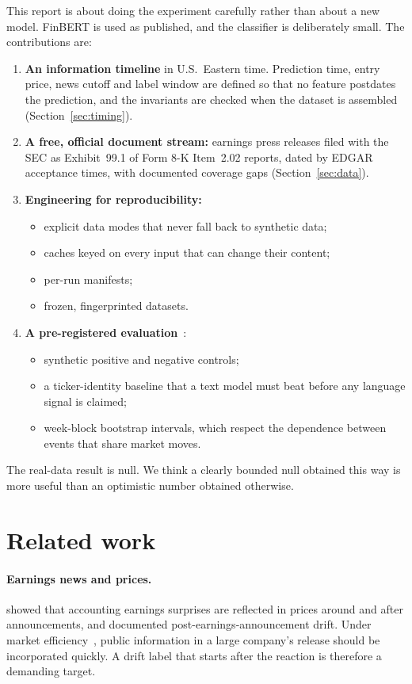 \documentclass[11pt]{article}
\begin{document}
This report is about doing the experiment carefully rather than about a new model. FinBERT is
used as published, and the classifier is deliberately small. The contributions are:
\begin{enumerate}
  \item \textbf{An information timeline} in U.S.\ Eastern time. Prediction time, entry price,
  news cutoff and label window are defined so that no feature postdates the prediction, and
  the invariants are checked when the dataset is assembled (Section~\ref{sec:timing}).
  \item \textbf{A free, official document stream:} earnings press releases filed with the SEC
  as Exhibit~99.1 of Form 8-K Item~2.02 reports, dated by EDGAR acceptance times, with
  documented coverage gaps (Section~\ref{sec:data}).
  \item \textbf{Engineering for reproducibility:}
  \begin{itemize}
    \item explicit data modes that never fall back to synthetic data;
    \item caches keyed on every input that can change their content;
    \item per-run manifests;
    \item frozen, fingerprinted datasets.
  \end{itemize}
  \item \textbf{A pre-registered evaluation}~\citep{nosek2018}:
  \begin{itemize}
    \item synthetic positive and negative controls;
    \item a ticker-identity baseline that a text model must beat before any language signal is
    claimed;
    \item week-block bootstrap intervals, which respect the dependence between events that
    share market moves.
  \end{itemize}
\end{enumerate}
The real-data result is null. We think a clearly bounded null obtained this way is more useful
than an optimistic number obtained otherwise.

\section{Related work}
\paragraph{Earnings news and prices.} \citet{ball1968} showed that accounting earnings
surprises are reflected in prices around and after announcements, and \citet{bernard1989}
documented post-earnings-announcement drift. Under market efficiency~\citep{fama1970},
public information in a large company's release should be incorporated quickly. A drift label
that starts after the reaction is therefore a demanding target.
\end{document}
